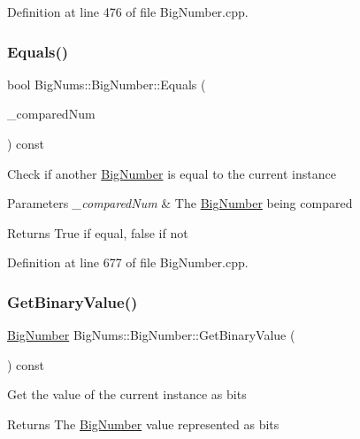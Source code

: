 Definition at line 476 of file Big\+Number.\+cpp.

\mbox{\label{class_big_nums_1_1_big_number_af459e1abf1ec5721b7288979e71cd672}} 
\subsubsection{\texorpdfstring{Equals()}{Equals()}}
{\footnotesize\ttfamily bool Big\+Nums\+::\+Big\+Number\+::\+Equals (\begin{DoxyParamCaption}\item[{const \mbox{\hyperlink{class_big_nums_1_1_big_number}{Big\+Number}} \&}]{\+\_\+compared\+Num }\end{DoxyParamCaption}) const}

Check if another \mbox{\hyperlink{class_big_nums_1_1_big_number}{Big\+Number}} is equal to the current instance 
\begin{DoxyParams}{Parameters}
{\em \+\_\+compared\+Num} & The \mbox{\hyperlink{class_big_nums_1_1_big_number}{Big\+Number}} being compared \\
\hline
\end{DoxyParams}
\begin{DoxyReturn}{Returns}
True if equal, false if not 
\end{DoxyReturn}


Definition at line 677 of file Big\+Number.\+cpp.

\mbox{\label{class_big_nums_1_1_big_number_a02c53d5b7c27e3b80c5f8ee5982a8875}} 
\subsubsection{\texorpdfstring{GetBinaryValue()}{GetBinaryValue()}}
{\footnotesize\ttfamily \mbox{\hyperlink{class_big_nums_1_1_big_number}{Big\+Number}} Big\+Nums\+::\+Big\+Number\+::\+Get\+Binary\+Value (\begin{DoxyParamCaption}{ }\end{DoxyParamCaption}) const}

Get the value of the current instance as bits \begin{DoxyReturn}{Returns}
The \mbox{\hyperlink{class_big_nums_1_1_big_number}{Big\+Number}} value represented as bits 
\end{DoxyReturn}


